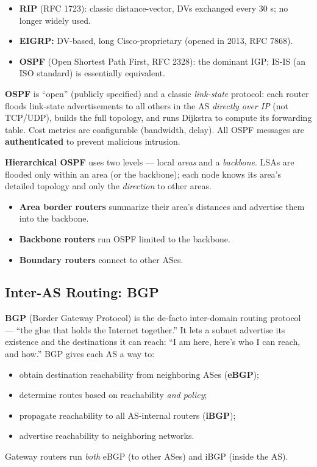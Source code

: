 \documentclass[hidelinks]{article}
\begin{document}
\begin{itemize}
    \item \textbf{RIP} (RFC 1723): classic distance-vector, DVs exchanged every
    30 s; no longer widely used.
    \item \textbf{EIGRP:} DV-based, long Cisco-proprietary (opened in 2013,
    RFC 7868).
    \item \textbf{OSPF} (Open Shortest Path First, RFC 2328): the dominant IGP;
    IS-IS (an ISO standard) is essentially equivalent.
\end{itemize}

\textbf{OSPF} is ``open'' (publicly specified) and a classic \emph{link-state}
protocol: each router floods link-state advertisements to all others in the AS
\emph{directly over IP} (not TCP/UDP), builds the full topology, and runs
Dijkstra to compute its forwarding table. Cost metrics are configurable
(bandwidth, delay). All OSPF messages are \textbf{authenticated} to prevent
malicious intrusion.

\textbf{Hierarchical OSPF} uses two levels --- local \emph{areas} and a
\emph{backbone}. LSAs are flooded only within an area (or the backbone); each
node knows its area's detailed topology and only the \emph{direction} to other
areas.
\begin{itemize}
    \item \textbf{Area border routers} summarize their area's distances and
    advertise them into the backbone.
    \item \textbf{Backbone routers} run OSPF limited to the backbone.
    \item \textbf{Boundary routers} connect to other ASes.
\end{itemize}

\subsection{Inter-AS Routing: BGP}

\textbf{BGP} (Border Gateway Protocol) is the de-facto inter-domain routing
protocol --- ``the glue that holds the Internet together.'' It lets a subnet
advertise its existence and the destinations it can reach: ``I am here, here's
who I can reach, and how.'' BGP gives each AS a way to:
\begin{itemize}
    \item obtain destination reachability from neighboring ASes (\textbf{eBGP});
    \item determine routes based on reachability \emph{and policy};
    \item propagate reachability to all AS-internal routers (\textbf{iBGP});
    \item advertise reachability to neighboring networks.
\end{itemize}
Gateway routers run \emph{both} eBGP (to other ASes) and iBGP (inside the AS).
\end{document}
